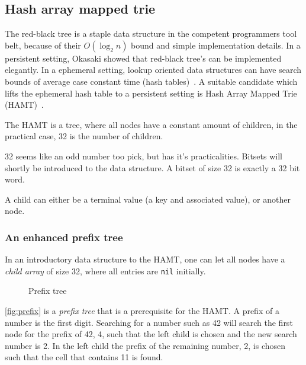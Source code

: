 \subsection{Hash array mapped trie}
The red-black tree is a staple data structure in the competent programmers tool belt, because of their $O(\log_2 n)$ bound and simple implementation details.
In a persistent setting, Okasaki showed that red-black tree's can be implemented elegantly.
In a ephemeral setting, lookup oriented data structures can have search bounds of average case constant time (hash tables)~\cite{cormen2009introduction}.
A suitable candidate which lifts the ephemeral hash table to a persistent setting is Hash Array Mapped Trie (HAMT)~\cite{bagwell2001ideal}.

The HAMT is a tree, where all nodes have a constant amount of children, in the practical case, 32 is the number of children.
\begin{remark}
	32 seems like an odd number too pick, but has it's practicalities.
	Bitsets will shortly be introduced to the data structure.
	A bitset of size 32 is exactly a 32 bit word.
\end{remark}
A child can either be a terminal value (a key and associated value), or another node.

\subsubsection{An enhanced prefix tree}
In an introductory data structure to the HAMT, one can let all nodes have a \textit{child array} of size 32, where all entries are \texttt{nil} initially.
\begin{figure}
  \centering
  \caption{Prefix tree}
  \label{fig:prefix}
\end{figure}
\autoref{fig:prefix} is a \textit{prefix tree} that is a prerequisite for the HAMT.
A prefix of a number is the first digit.
Searching for a number such as 42 will search the first node for the prefix of 42, 4, such that the left child is chosen and the new search number is 2.
In the left child the prefix of the remaining number, 2, is chosen such that the cell that contains 11 is found. 


